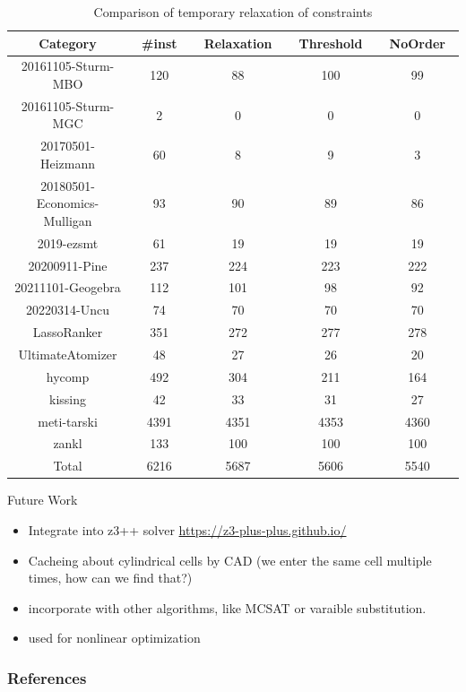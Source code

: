 \begin{frame}
    \begin{table}[!t]
        \small
        \centering
        \begin{tabular}{c | c | c | c | c }
        Category & ~\#inst~ & ~Relaxation~ & ~Threshold~ & ~NoOrder~ \\ \hline
        20161105-Sturm-MBO & 120 & 88 & 100 & 99 \\
        20161105-Sturm-MGC & 2 & 0 & 0 & 0 \\
        20170501-Heizmann & 60 & 8 & 9 & 3 \\
        20180501-Economics-Mulligan & 93 & 90 & 89 & 86 \\
        2019-ezsmt & 61 & 19 & 19 & 19 \\
        20200911-Pine & 237 & 224 & 223 & 222 \\
        20211101-Geogebra & 112 & 101 & 98 & 92 \\
        20220314-Uncu & 74 & 70 & 70 & 70 \\
        LassoRanker & 351 & 272 & 277 & 278 \\
        UltimateAtomizer & 48 & 27 & 26 & 20 \\
        hycomp & 492 & 304 & 211 & 164 \\
        kissing & 42 & 33 & 31 & 27 \\
        meti-tarski & 4391 & 4351 & 4353 & 4360 \\
        zankl & 133 & 100 & 100 & 100 \\ \hline
        Total & 6216 & 5687 & 5606 & 5540
        \end{tabular}
        \vspace{2mm}
        \caption{Comparison of temporary relaxation of constraints}
        \label{tab:compare-relaxation}
        \end{table}
\end{frame}

\begin{frame}{Future Work}
    \begin{itemize}
        \item Integrate into z3++ solver \url{https://z3-plus-plus.github.io/}
        \item Cacheing about cylindrical cells by CAD (we enter the same cell multiple times, how can we find that?)
        \item incorporate with other algorithms, like MCSAT or varaible substitution.
        \item used for nonlinear optimization
    \end{itemize}
\end{frame}

\begin{frame}[allowframebreaks]
    \frametitle{References}
\printbibliography
\end{frame}